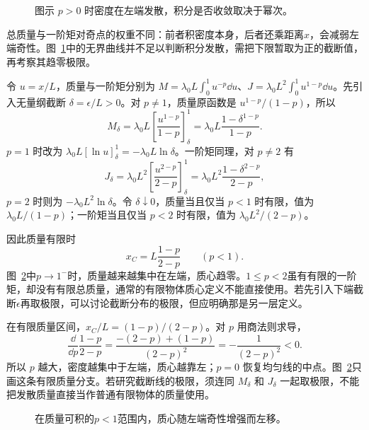 \begin{figure}[H]\centering
{}
\caption{图示 $p>0$ 时密度在左端发散，积分是否收敛取决于幂次。}\label{fig:c1-h18-q}
\end{figure}
\begin{solution}
总质量与一阶矩对奇点的权重不同：前者积密度本身，后者还乘距离$x$，会减弱左端奇性。图~\ref{fig:c1-h18-q}中的无界曲线并不足以判断积分发散，需把下限暂取为正的截断值，再考察其趋零极限。


令 $u=x/L$，质量与一阶矩分别为 $M=\lambda_0L\int_0^1u^{-p}\dd u$、$J=\lambda_0L^2\int_0^1u^{1-p}\dd u$。先引入无量纲截断 $\delta=\epsilon/L>0$。对 $p\ne1$，质量原函数是 $u^{1-p}/(1-p)$，所以
\[
M_\delta=\lambda_0L\left[\frac{u^{1-p}}{1-p}\right]_\delta^1
=\lambda_0L\frac{1-\delta^{1-p}}{1-p}.
\]
$p=1$ 时改为 $\lambda_0L[\ln u]_\delta^1=-\lambda_0L\ln\delta$。一阶矩同理，对 $p\ne2$ 有
\[
J_\delta=\lambda_0L^2\left[\frac{u^{2-p}}{2-p}\right]_\delta^1
=\lambda_0L^2\frac{1-\delta^{2-p}}{2-p},
\]
$p=2$ 时则为 $-\lambda_0L^2\ln\delta$。令 $\delta\downarrow0$，质量当且仅当 $p<1$ 时有限，值为 $\lambda_0L/(1-p)$；一阶矩当且仅当 $p<2$ 时有限，值为 $\lambda_0L^2/(2-p)$。

因此质量有限时
\[\boxed{x_C=L\frac{1-p}{2-p}\qquad(p<1)}.\]
图~\ref{fig:c1-h18-s}中$p\to1^-$时，质量越来越集中在左端，质心趋零。$1\le p<2$虽有有限的一阶矩，却没有有限总质量，通常的有限物体质心定义不能直接使用。若先引入下端截断$\epsilon$再取极限，可以讨论截断分布的极限，但应明确那是另一层定义。


在有限质量区间，$x_C/L=(1-p)/(2-p)$。对 $p$ 用商法则求导，
\[
\frac{\dd}{\dd p}\frac{1-p}{2-p}
=\frac{-(2-p)+(1-p)}{(2-p)^2}=-\frac1{(2-p)^2}<0.
\]
所以 $p$ 越大，密度越集中于左端，质心越靠左；$p=0$ 恢复均匀线的中点。图~\ref{fig:c1-h18-s}只画这条有限质量分支。若研究截断线的极限，须连同 $M_\delta$ 和 $J_\delta$ 一起取极限，不能把发散质量直接当作普通有限物体的质量使用。

\begin{figure}[H]\centering
{}
\caption{在质量可积的$p<1$范围内，质心随左端奇性增强而左移。}\label{fig:c1-h18-s}
\end{figure}
\end{solution}

